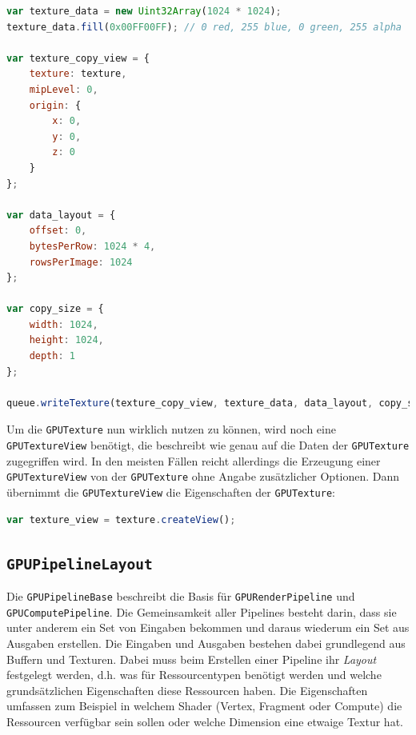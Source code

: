 \documentclass[oneside]{ausarbeitung}
\begin{document}
\begin{minipage}{\textwidth}
\begin{lstlisting}[language=JavaScript]
var texture_data = new Uint32Array(1024 * 1024);
texture_data.fill(0x00FF00FF); // 0 red, 255 blue, 0 green, 255 alpha

var texture_copy_view = {
    texture: texture,
    mipLevel: 0,
    origin: {
        x: 0,
        y: 0,
        z: 0
    }
};
    
var data_layout = {
    offset: 0,
    bytesPerRow: 1024 * 4,
    rowsPerImage: 1024
};

var copy_size = {
    width: 1024,
    height: 1024,
    depth: 1
};
    
queue.writeTexture(texture_copy_view, texture_data, data_layout, copy_size);
\end{lstlisting}
\end{minipage}

Um die \texttt{GPUTexture} nun wirklich nutzen zu können, wird noch eine \texttt{GPUTextureView} benötigt, die beschreibt wie genau auf die Daten der \texttt{GPUTexture} zugegriffen wird. In den meisten Fällen reicht allerdings die Erzeugung einer \texttt{GPUTextureView} von der \texttt{GPUTexture} ohne Angabe zusätzlicher Optionen. Dann übernimmt die \texttt{GPUTextureView} die Eigenschaften der \texttt{GPUTexture}:

\begin{lstlisting}[language=JavaScript]
var texture_view = texture.createView();
\end{lstlisting}

\subsection{\texttt{GPUPipelineLayout}}
\label{sub:gpupipelinebase}
Die \texttt{GPUPipelineBase} beschreibt die Basis für \texttt{GPURenderPipeline} und \texttt{GPUComputePipeline}. Die Gemeinsamkeit aller Pipelines besteht darin, dass sie unter anderem ein Set von Eingaben bekommen und daraus wiederum ein Set aus Ausgaben erstellen. Die Eingaben und Ausgaben bestehen dabei grundlegend aus Buffern und Texturen. Dabei muss beim Erstellen einer Pipeline ihr \textit{Layout} festgelegt werden, d.h. was für Ressourcentypen benötigt werden und welche grundsätzlichen Eigenschaften diese Ressourcen haben. Die Eigenschaften umfassen zum Beispiel in welchem Shader (Vertex, Fragment oder Compute) die Ressourcen verfügbar sein sollen oder welche Dimension eine etwaige Textur hat.
\end{document}

